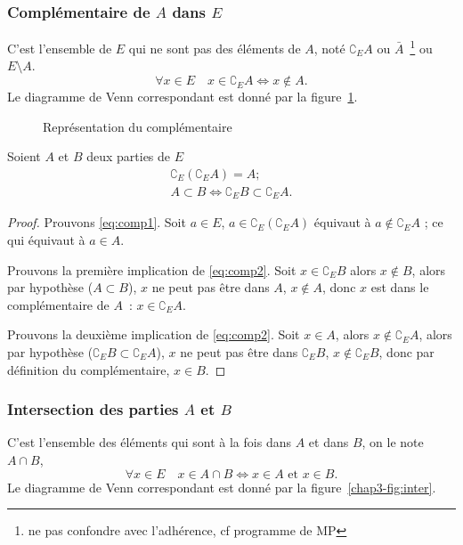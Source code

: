 \subsubsection{Complémentaire de $A$ dans $E$} 
\label{chap3-subsubsec:complementaire}
C'est l'ensemble de $E$ qui ne sont pas des éléments de $A$, noté $\complement_E A$ ou $\bar{A}$~\footnote{ne pas confondre avec l'adhérence, cf programme de MP} ou $E \setminus A$.
\begin{equation} 
  \forall x \in E \quad x \in \complement_E A \iff x \not\in A.
\end{equation}
Le diagramme de Venn correspondant est donné par la figure~\ref{chap3-fig:comp}.
%
\begin{figure}
\centering
{}
\caption{Représentation du complémentaire}
\label{chap3-fig:comp}
\end{figure}
%
\begin{prop}
  Soient $A$ et $B$ deux parties de $E$
  \begin{gather}
  \complement_E (\complement_E A)=A; \label{eq:comp1}\\
  A \subset B \iff \complement_E B \subset \complement_E A. \label{eq:comp2}
  \end{gather}
\end{prop}
\begin{proof}
    Prouvons \eqref{eq:comp1}. Soit $a \in E$, $a \in \complement_E (\complement_E A)$ équivaut à $a \not\in \complement_E A$ ; ce qui équivaut à
    $a \in A$.
    
    Prouvons la première implication de \eqref{eq:comp2}. Soit $x \in \complement_E B$ alors $x \not\in B$, alors par
    hypothèse ($A \subset B$), $x$ ne peut pas être dans $A$, $x \not\in A$, donc $x$ est dans le complémentaire de
    $A$~: $x \in \complement_E A$.

    Prouvons la deuxième implication de \eqref{eq:comp2}. Soit $x \in A$, alors $x \not\in \complement_E A$, alors par
    hypothèse ($\complement_E B \subset \complement_E A$), $x$ ne peut pas être dans $\complement_E B$, $x \not\in
    \complement_E B$, donc par définition du complémentaire, $x \in B$.
\end{proof}
%
\subsubsection{Intersection des parties $A$ et $B$}
\label{chap3-subsubsec:intersection}
C'est l'ensemble des éléments qui sont à la fois dans $A$ et dans $B$, on le note $A \cap B$,
\begin{equation}
  \forall x \in E \quad x \in A \cap B \iff x \in A \text{~et~} x \in B.
\end{equation}
Le diagramme de Venn correspondant est donné par la figure~\ref{chap3-fig:inter}.

